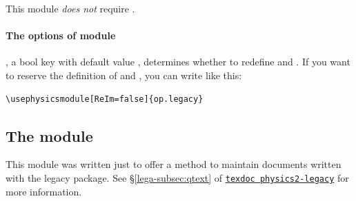\documentclass[11pt,letterpaper]{article}
\begin{document}
This module \emph{does not} require .

\paragraph{The options of  module}
, a bool key with default value , determines whether to
redefine  and . If you want to reserve the definition of
 and , you can write like this:
\begin{Verbatim}
\usephysicsmodule[ReIm=false]{op.legacy}
\end{Verbatim}

\subsection{The  module}
This module was written just to offer a method to maintain documents written
with the legacy  package. See \S\ref*{lega-subsec:qtext} of
\href{./physics2-legacy.pdf}{\texttt{texdoc physics2-legacy}} for
more information.
\end{document}
